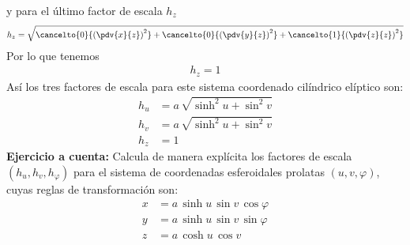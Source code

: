 y para el último factor de escala $h_{z}$
\begin{align*}
h_{z} = \sqrt{ \cancelto{0}{\left( \pdv{x}{z} \right)^{2}} + \cancelto{0}{\left( \pdv{y}{z} \right)^{2}} + \cancelto{1}{\left( \pdv{z}{z} \right)^{2}}}
\end{align*}
Por lo que tenemos
\begin{align*}
h_{z} = 1
\end{align*}
Así los tres factores de escala para este sistema coordenado cilíndrico elíptico son:
\begin{align*}
h_{u} &= a \, \sqrt{ \sinh^{2} u + \sin^{2} v} \\[1em]
h_{v} &= a \, \sqrt{ \sinh^{2} u + \sin^{2} v} \\[1em]
h_{z} &= 1
\end{align*}
\textbf{Ejercicio a cuenta: } Calcula de manera explícita los factores de escala $(h_{u}, h_{v}, h_{\varphi})$ para el sistema de coordenadas esferoidales prolatas $(u, v, \varphi)$, cuyas reglas de transformación son:
\begin{align*}
x &= a \, \sinh u \, \sin v \, \cos \varphi \\
y &= a \, \sinh u \, \sin v \, \sin \varphi \\
z &= a \, \cosh u \, \cos v
\end{align*}

